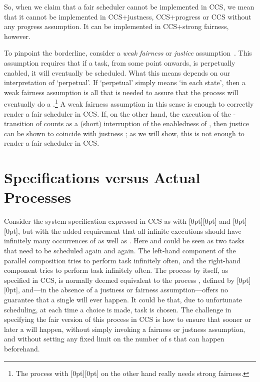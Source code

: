\documentclass[smallcondensed]{svjour3}
\newcommand{\plat}[1]{\raisebox{0pt}[0pt][0pt]{#1}}  \def\precond#1{{\vphantom{#1}}^\bullet #1}
\begin{document}
So, when we claim that a fair scheduler cannot be implemented in CCS, we mean that it
cannot be implemented in CCS+justness, CCS+progress or CCS without any progress assumption.
It can be implemented in CCS+strong fairness, however. 

To pinpoint the borderline, 
consider a \emph{weak fairness} or \emph{justice} assumption~\cite{GPSS80,LPS81}. This assumption
requires that if a task, from some point onwards, is
perpetually enabled, it will eventually be scheduled. What this means depends on our interpretation
of `perpetual'. If `perpetual' simply means `in each state', then a weak fairness assumption
is all that is needed to assure that the process  will eventually do a .\footnote{The process
   with {\plat{}} on the other hand really needs
  strong fairness.} A weak fairness assumption in this
sense is enough to correctly render a fair scheduler in CCS\@. If, on the other hand, the execution
of the -transition of  counts as a (short) interruption of the enabledness of , then
justice can be shown to coincide with justness \cite{GH14}; as we will show,
this is not enough to render a fair scheduler in CCS\@.

\section{Specifications versus Actual Processes}\label{ssec:spec vs implementation}


Consider the system specification  expressed in\vspace{2pt}
CCS as  with \plat{} and \plat{},
but with the added requirement that all infinite executions should have infinitely many occurrences
of  as well as . Here  and  could be seen as two tasks that need to be scheduled again
and again. The left-hand component  of the parallel composition tries to perform task 
infinitely often, and the right-hand component tries to perform task  infinitely often.
The process  by itself, as specified in CCS,\vspace{2pt} is normally deemed equivalent to the process ,
defined by \plat{}, and---in the absence of a justness or
fairness assumption---offers no guarantee that a single 
will ever happen. It could be that, due to unfortunate scheduling, at each time a choice is made, task 
is chosen. The challenge in specifying the fair version  of this process in CCS is 
how to ensure that sooner or later a  will happen, without simply invoking a fairness or justness
assumption, and without setting any fixed limit on the number of s that can happen beforehand.
\end{document}
